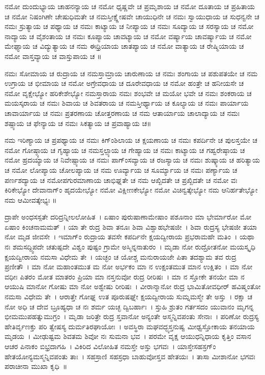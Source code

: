 ನಮೋ ದುಂದುಭ್ಯಾಯ ಚಾಹನನ್ಯಾಯ ಚ ನಮೋ ಧೃಷ್ಣವೇ ಚ ಪ್ರಮೃಶಾಯ ಚ ನಮೋ ದೂತಾಯ ಚ ಪ್ರಹಿತಾಯ ಚ ನಮೋ ನಿಷಂಗಿಣೇ ಚೇಷುಧಿಮತೇ ಚ ನಮಸ್ತೀಕ್ಷ್ಣೇಷವೇ ಚಾಯುಧಿನೇ ಚ ನಮಃ ಸ್ವಾಯುಧಾಯ ಚ ಸುಧನ್ವನೇ ಚ ನಮಃ ಸ್ರುತ್ಯಾಯ ಚ ಪಥ್ಯಾಯ ಚ ನಮಃ ಕಾಟ್ಯಾಯ ಚ ನೀಪ್ಯಾಯ ಚ ನಮಃ ಸೂದ್ಯಾಯ ಚ ಸರಸ್ಯಾಯ ಚ ನಮೋ ನಾದ್ಯಾಯ ಚ ವೈಶಂತಾಯ ಚ ನಮಃ ಕೂಪ್ಯಾಯ ಚಾವಟ್ಯಾಯ ಚ ನಮೋ ವರ್ಷ್ಯಾಯ ಚಾವರ್ಷ್ಯಾಯ ಚ ನಮೋ ಮೇಘ್ಯಾಯ ಚ ವಿದ್ಯುತ್ಯಾಯ ಚ ನಮ ಈಧ್ರಿಯಾಯ ಚಾತಪ್ಯಾಯ ಚ ನಮೋ ವಾತ್ಯಾಯ ಚ ರೇಷ್ಮಿಯಾಯ ಚ ನಮೋ ವಾಸ್ತವ್ಯಾಯ ಚ ವಾಸ್ತುಪಾಯ ಚ ॥

ನಮಃ ಸೋಮಾಯ ಚ ರುದ್ರಾಯ ಚ ನಮಸ್ತಾಮ್ರಾಯ ಚಾರುಣಾಯ ಚ ನಮಃ ಶಂಗಾಯ ಚ ಪಶುಪತಯೇ ಚ ನಮ ಉಗ್ರಾಯ ಚ ಭೀಮಾಯ ಚ ನಮೋ ಅಗ್ರೇವಧಾಯ ಚ ದೂರೇವಧಾಯ ಚ ನಮೋ ಹಂತ್ರೇ ಚ ಹನೀಯಸೇ ಚ ನಮೋ ವೃಕ್ಷೇಭ್ಯೋ ಹರಿಕೇಶೇಭ್ಯೋ ನಮಸ್ತಾರಾಯ ನಮಃ ಶಂಭವೇ ಚ ಮಯೋ ಭವೇ ಚ ನಮಃ ಶಂಕರಾಯ ಚ ಮಯಸ್ಕರಾಯ ಚ ನಮಃ ಶಿವಾಯ ಚ ಶಿವತರಾಯ ಚ ನಮಸ್ತೀರ್ಥ್ಯಾಯ ಚ ಕೂಲ್ಯಾಯ ಚ ನಮಃ ಪಾರ್ಯಾಯ ಚಾವಾರ್ಯಾಯ ಚ ನಮಃ ಪ್ರತರಣಾಯ ಚೋತ್ತರಣಾಯ ಚ ನಮ ಆತಾರ್ಯಾಯ ಚಾಲಾದ್ಯಾಯ ಚ ನಮಃ ಶಷ್ಪ್ಯಾಯ ಚ ಫೇನ್ಯಾಯ ಚ ನಮಃ ಸಿಕತ್ಯಾಯ ಚ ಪ್ರವಾಹ್ಯಾಯ ಚ॥

ನಮ ಇರಿಣ್ಯಾಯ ಚ ಪ್ರಪಥ್ಯಾಯ ಚ ನಮಃ ಕಿಗ್ಂಶಿಲಾಯ ಚ ಕ್ಷಯಣಾಯ ಚ ನಮಃ ಕಪರ್ದಿನೇ ಚ ಪುಲಸ್ತಯೇ ಚ ನಮೋ ಗೋಷ್ಠ್ಯಾಯ ಚ ಗೃಹ್ಯಾಯ ಚ ನಮಸ್ತಲ್ಪ್ಯಾಯ ಚ ಗೇಹ್ಯಾಯ ಚ ನಮಃ ಕಾಟ್ಯಾಯ ಚ ಗಹ್ವರೇಷ್ಠಾಯ ಚ ನಮೋ ಹ್ರದಯ್ಯಾಯ ಚ ನಿವೇಷ್ಪ್ಯಾಯ ಚ ನಮಃ ಪಾಗ್ಂಸವ್ಯಾಯ ಚ ರಜಸ್ಯಾಯ ಚ ನಮಃ ಶುಷ್ಕ್ಯಾಯ ಚ ಹರಿತ್ಯಾಯ ಚ ನಮೋ ಲೋಪ್ಯಾಯ ಚೋಲಪ್ಯಾಯ ಚ ನಮ ಊರ್ವ್ಯಾಯ ಚ ಸೂರ್ಮ್ಯಾಯ ಚ ನಮಃ ಪರ್ಣ್ಯಾಯ ಚ ಪರ್ಣಶದ್ಯಾಯ ಚ ನಮೋಪಗುರಮಾಣಾಯ ಚಾಭಿಘ್ನತೇ ಚ ನಮ ಆಖ್ಖಿದತೇ ಚ ಪ್ರಖ್ಖಿದತೇ ಚ ನಮೋ ವಃ ಕಿರಿಕೇಭ್ಯೋ ದೇವಾನಾಗ್ಂ ಹೃದಯೇಭ್ಯೋ ನಮೋ ವಿಕ್ಷೀಣಕೇಭ್ಯೋ ನಮೋ ವಿಚಿನ್ವತ್ಕೇಭ್ಯೋ ನಮ ಆನಿರ್ಹತೇಭ್ಯೋ ನಮ ಆಮೀವತ್ಕೇಭ್ಯಃ ॥

ದ್ರಾಪೇ ಅಂಧಸಸ್ಪತೇ ದರಿದ್ರನ್ನೀಲಲೋಹಿತ~। ಏಷಾಂ ಪುರುಷಾಣಾಮೇಷಾಂ ಪಶೂನಾಂ ಮಾ ಭೇರ್ಮಾರೋ ಮೋ ಏಷಾಂ ಕಿಂಚನಾಮಮತ್~। ಯಾ ತೇ ರುದ್ರ ಶಿವಾ ತನೂಃ ಶಿವಾ ವಿಶ್ವಾಹಭೇಷಜೀ~। ಶಿವಾ ರುದ್ರಸ್ಯ ಭೇಷಜೀ ತಯಾ ನೋ ಮೃಡ ಜೀವಸೇ~। ಇಮಾಗ್ಂ ರುದ್ರಾಯ ತವಸೇ ಕಪರ್ದಿನೇ ಕ್ಷಯದ್ವೀರಾಯ ಪ್ರಭರಾಮಹೇ ಮತಿಂ~। ಯಥಾ ನಃ ಶಮಸದ್ದ್ವಿಪದೇ ಚತುಷ್ಪದೇ ವಿಶ್ವಂ ಪುಷ್ಟಂ ಗ್ರಾಮೇ ಅಸ್ಮಿನ್ನನಾತುರಂ~। ಮೃಡಾ ನೋ ರುದ್ರೋತನೋ ಮಯಸ್ಕೃಧಿ ಕ್ಷಯದ್ವೀರಾಯ ನಮಸಾ ವಿಧೇಮ ತೇ~। ಯಚ್ಛಂ ಚ ಯೋಶ್ಚ ಮನುರಾಯಜೇ ಪಿತಾ ತದಶ್ಯಾಮ ತವ ರುದ್ರ ಪ್ರಣೀತೌ~। ಮಾ ನೋ ಮಹಾಂತಮುತ ಮ ನೋ ಅರ್ಭಕಂ ಮಾ ನ ಉಕ್ಷಂತಮುತ ಮಾನ ಉಕ್ಷಿತಂ~। ಮಾ ನೋ ವಧೀಃ ಪಿತರಂ ಮೋತ ಮಾತರಂ ಪ್ರಿಯಾ ಮಾ ನಸ್ತನುವೋ ರುದ್ರ ರೀರಿಷಃ~। ಮಾ ನ ಸ್ತೋಕೇ ತನಯೇ ಮಾ ನ ಆಯುಷಿ ಮಾನೋ ಗೋಷು ಮಾ ನೋ ಅಶ್ವೇಷು ರೀರಿಷಃ~। ವೀರಾನ್ಮಾನೋ ರುದ್ರ ಭಾಮಿತೋವಧೀರ್ ಹವಿಷ್ಮಂತೋ ನಮಸಾ ವಿಧೇಮ ತೇ~। ಆರಾತ್ತೇ ಗೋಘ್ನ ಉತ ಪೂರುಷಘ್ನೇ ಕ್ಷಯದ್ವೀರಾಯ ಸುಮ್ನಮಸ್ಮೇ ತೇ ಅಸ್ತು~। ರಕ್ಷಾ ಚ ನೋ ಅಧಿ ಚ ದೇವ ಬ್ರೂಹ್ಯಧಾ ಚ ನಃ ಶರ್ಮ ಯಚ್ಛ ದ್ವಿಬರ್ಹಾಃ~। ಸ್ತುಹಿ ಶ್ರುತಂ ಗರ್ತಸದಂ ಯುವಾನಂ ಮೃಗನ್ನ ಭೀಮಮುಪಹತ್ನುಮುಗ್ರಂ~। ಮೃಡಾ ಜರಿತ್ರೇ ರುದ್ರ ಸ್ತವಾನೋ ಅನ್ಯಂತೇ ಅಸ್ಮನ್ನಿವಪಂತು ಸೇನಾಃ~। ಪರಿಣೋ ರುದ್ರಸ್ಯ ಹೇತಿರ್ವೃಣಕ್ತು ಪರಿ ತ್ವೇಷಸ್ಯ ದುರ್ಮತಿರಘಾಯೋಃ~। ಅವಸ್ಥಿರಾ ಮಘವದ್ಭ್ಯಸ್ತನುಷ್ವ ಮೀಢ್ವಸ್ತೋಕಾಯ ತನಯಾಯ ಮೃಡಯ~। ಮೀಢುಷ್ಟಮ ಶಿವತಮ ಶಿವೋ ನಃ ಸುಮನಾ ಭವ~। ಪರಮೇ ವೃಕ್ಷ ಆಯುಧನ್ನಿಧಾಯ ಕೃತ್ತಿಂ ವಸಾನ ಆಚರ ಪಿನಾಕಂ ಬಿಭ್ರದಾಗಹಿ~। ವಿಕಿರಿದ ವಿಲೋಹಿತ ನಮಸ್ತೇ ಅಸ್ತು ಭಗವಃ~। ಯಾಸ್ತೇಸಹಸ್ರಗ್ಂ ಹೇತಯೋನ್ಯಮಸ್ಮನ್ನಿವಪಂತು ತಾಃ~। ಸಹಸ್ರಾಣಿ ಸಹಸ್ರಧಾ ಬಾಹುವೋಸ್ತವ ಹೇತಯಃ~। ತಾಸಾ ಮೀಶಾನೋ ಭಗವಃ ಪರಾಚೀನಾ ಮುಖಾ ಕೃಧಿ~॥

